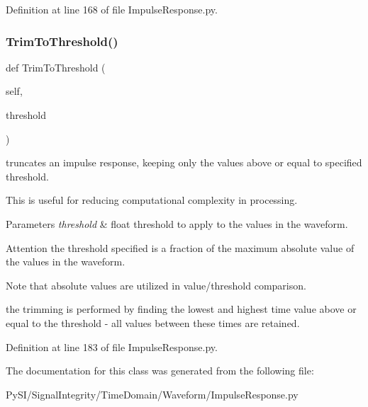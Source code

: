 Definition at line 168 of file Impulse\+Response.\+py.

\mbox{\label{classSignalIntegrity_1_1TimeDomain_1_1Waveform_1_1ImpulseResponse_1_1ImpulseResponse_ac9668c22e21b9fcbfb1163ba5c2f9577}} 
\subsubsection{\texorpdfstring{Trim\+To\+Threshold()}{TrimToThreshold()}}
{\footnotesize\ttfamily def Trim\+To\+Threshold (\begin{DoxyParamCaption}\item[{}]{self,  }\item[{}]{threshold }\end{DoxyParamCaption})}



truncates an impulse response, keeping only the values above or equal to specified threshold. 

This is useful for reducing computational complexity in processing.


\begin{DoxyParams}{Parameters}
{\em threshold} & float threshold to apply to the values in the waveform. \\
\hline
\end{DoxyParams}
\begin{DoxyAttention}{Attention}
the threshold specified is a fraction of the maximum absolute value of the values in the waveform. 
\end{DoxyAttention}
\begin{DoxyNote}{Note}
that absolute values are utilized in value/threshold comparison. 

the trimming is performed by finding the lowest and highest time value above or equal to the threshold -\/ all values between these times are retained. 
\end{DoxyNote}


Definition at line 183 of file Impulse\+Response.\+py.



The documentation for this class was generated from the following file\+:\begin{DoxyCompactItemize}
\item 
Py\+S\+I/\+Signal\+Integrity/\+Time\+Domain/\+Waveform/Impulse\+Response.\+py\end{DoxyCompactItemize}
